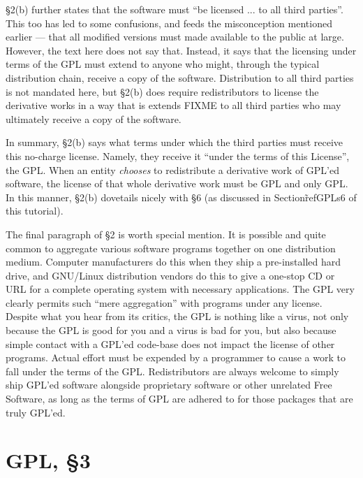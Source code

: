\documentclass[12pt]{report}
\begin{document}
\S 2(b) further states that the software must ``be licensed ... to all
third parties''.  This too has led to some confusions, and feeds the
misconception mentioned earlier --- that all modified versions must made
available to the public at large.  However, the text here does not say
that.  Instead, it says that the licensing under terms of the GPL must
extend to anyone who might, through the typical distribution chain,
receive a copy of the software.  Distribution to all third parties is not
mandated here, but \S 2(b) does require redistributors to license the
derivative works in a way that is extends FIXME to all third parties who may
ultimately receive a copy of the software.

In summary, \S 2(b) says what terms under which the third parties must
receive this no-charge license.  Namely, they receive it ``under the terms
of this License'', the GPL.  When an entity \emph{chooses} to redistribute
a derivative work of GPL'ed software, the license of that whole derivative
work must be GPL and only GPL\@.  In this manner, \S 2(b) dovetails nicely
with \S 6 (as discussed in Section\~ref{GPLs6} of this tutorial).

\medskip

The final paragraph of \S 2 is worth special mention.  It is possible and
quite common to aggregate various software programs together on one
distribution medium.  Computer manufacturers do this when they ship a
pre-installed hard drive, and GNU/Linux distribution vendors do this to
give a one-stop CD or URL for a complete operating system with necessary
applications.  The GPL very clearly permits such ``mere aggregation'' with
programs under any license.  Despite what you hear from its critics, the
GPL is nothing like a virus, not only because the GPL is good for you and
a virus is bad for you, but also because simple contact with a GPL'ed
code-base does not impact the license of other programs.  Actual effort
must be expended by a programmer to cause a work to fall under the terms
of the GPL.  Redistributors are always welcome to simply ship GPL'ed
software alongside proprietary software or other unrelated Free Software,
as long as the terms of GPL are adhered to for those packages that are
truly GPL'ed.

\section{GPL, \S 3}

\end{document}
